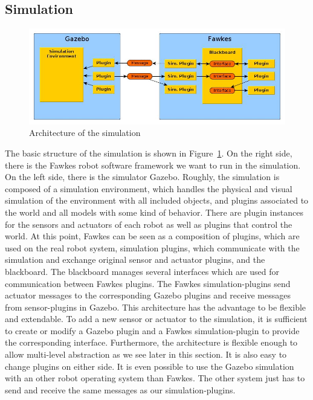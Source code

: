 \subsection{Simulation}
\label{sec:architecture_simulation}
\begin{figure}
\includegraphics[width=\textwidth]{tabs/fawkes_gazebo}
\caption{Architecture of the simulation}
\label{fig:fawkes_gazebo}
\end{figure}
The basic structure of the simulation is shown in Figure~\ref{fig:fawkes_gazebo}. On the right side, there is the Fawkes robot software framework we want to run in the simulation. On the left side, there is the simulator Gazebo. Roughly, the simulation is composed of a simulation environment, which handles the physical and visual simulation of the environment with all included objects, and plugins associated to the world and all models with some kind of behavior. There are plugin instances for the sensors and actuators of each robot as well as plugins that control the world. At this point, Fawkes can be seen as a composition of plugins, which are used on the real robot system, simulation plugins, which communicate with the simulation and exchange original sensor and actuator plugins, and the blackboard. The blackboard manages several interfaces which are used for communication between Fawkes plugins. The Fawkes simulation-plugins send actuator messages to the corresponding Gazebo plugins and receive messages from sensor-plugins in Gazebo. This architecture has the advantage to be flexible and extendable. To add a new sensor or actuator to the simulation, it is sufficient to create or modify a Gazebo plugin and a Fawkes simulation-plugin to provide the corresponding interface. Furthermore, the architecture is flexible enough to allow multi-level abstraction as we see later in this section. It is also easy to change plugins on either side. It is even possible to use the Gazebo simulation with an other robot operating system than Fawkes. The other system just has to send and receive the same messages as our simulation-plugins.


